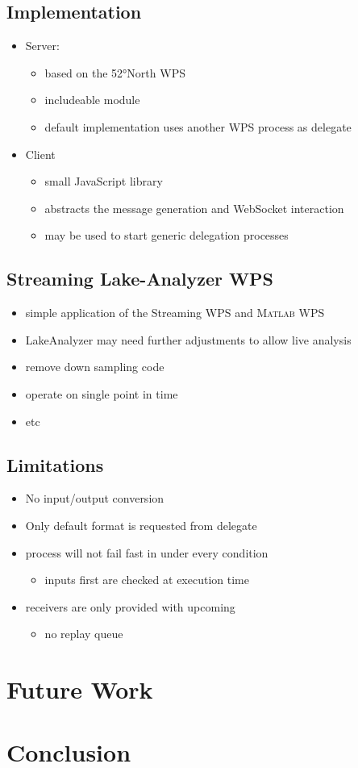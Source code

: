 	\subsection{Implementation}
	\begin{itemize}
		\item Server:
		\begin{itemize}
			\item based on the 52°North WPS
			\item includeable module
			\item default implementation uses another WPS process as delegate
		\end{itemize}
		\item Client
		\begin{itemize}
			\item small JavaScript library
			\item abstracts the message generation and WebSocket interaction
			\item may be used to start generic delegation processes
		\end{itemize}
	\end{itemize}
	\subsection{Streaming Lake-Analyzer WPS}
	\begin{itemize}
		\item simple application of the Streaming WPS and \textsc{Matlab} WPS
		\item LakeAnalyzer may need further adjustments to allow live analysis
		\item remove down sampling code
		\item operate on single point in time
		\item etc
	\end{itemize}
	\subsection{Limitations}
	\begin{itemize}
		\item No input/output conversion
		\item Only default format is requested from delegate
		\item process will not fail fast in under every condition
		\begin{itemize}
			\item inputs first are checked at execution time
		\end{itemize}
		\item receivers are only provided with upcoming
		\begin{itemize}
			\item no replay queue
		\end{itemize}
	\end{itemize}
\section{Future Work}
\section{Conclusion}
